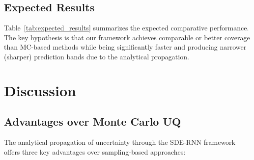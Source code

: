 \documentclass[10pt,twocolumn]{article}
\begin{document}
\subsection{Expected Results}

Table~\ref{tab:expected_results} summarizes the expected comparative performance. The key hypothesis is that our framework achieves comparable or better coverage than MC-based methods while being significantly faster and producing narrower (sharper) prediction bands due to the analytical propagation.


\section{Discussion}
\label{sec:discussion}

\subsection{Advantages over Monte Carlo UQ}

The analytical propagation of uncertainty through the SDE-RNN framework offers three key advantages over sampling-based approaches:
\end{document}
